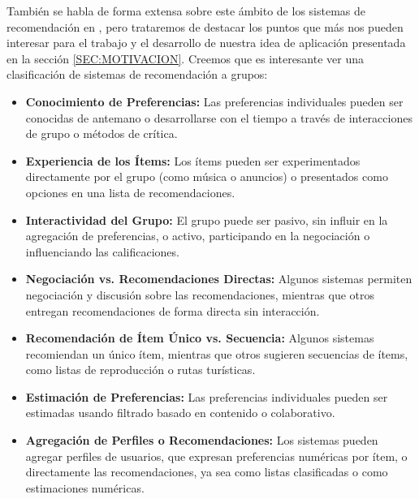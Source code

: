 También se habla de forma extensa sobre este ámbito de los sistemas de recomendación en \cite{grouprecommender}, pero trataremos de destacar los puntos
que más nos pueden interesar para el trabajo y el desarrollo de nuestra idea de aplicación presentada en la sección \ref{SEC:MOTIVACION}. Creemos que es 
interesante ver una clasificación de sistemas de recomendación a grupos:

\begin{itemize}
    \item \textbf{Conocimiento de Preferencias:} Las preferencias individuales pueden ser conocidas de antemano o desarrollarse con el tiempo a través 
    de interacciones de grupo o métodos de crítica.
    \item \textbf{Experiencia de los Ítems:} Los ítems pueden ser experimentados directamente por el grupo (como música o anuncios) o presentados como 
    opciones en una lista de recomendaciones.
    \item \textbf{Interactividad del Grupo:} El grupo puede ser pasivo, sin influir en la agregación de preferencias, o activo, participando en la 
    negociación o influenciando las calificaciones.
    \item \textbf{Negociación vs. Recomendaciones Directas:} Algunos sistemas permiten negociación y discusión sobre las recomendaciones, mientras que 
    otros entregan recomendaciones de forma directa sin interacción.
    \item \textbf{Recomendación de Ítem Único vs. Secuencia:} Algunos sistemas recomiendan un único ítem, mientras que otros sugieren secuencias de ítems,
     como listas de reproducción o rutas turísticas.
    \item \textbf{Estimación de Preferencias:} Las preferencias individuales pueden ser estimadas usando filtrado basado en contenido o colaborativo.
    \item \textbf{Agregación de Perfiles o Recomendaciones:} Los sistemas pueden agregar perfiles de usuarios, que expresan preferencias numéricas por ítem, 
    o directamente las recomendaciones, ya sea como listas clasificadas o como estimaciones numéricas.
\end{itemize}

